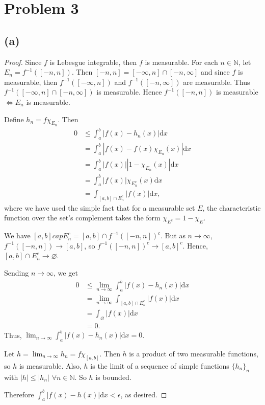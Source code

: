 \documentclass{article}
\newcommand{\N}{\mathbb{N}} %
\begin{document}
\section*{Problem 3}
\subsection*{(a)}
\begin{proof}
	Since $f$ is Lebesgue integrable, then $f$ is measurable. For each $n \in \N$, let $E_n = f^{-1}([-n, n])$. Then $[-n, n] = [-\infty, n] \cap [-n, \infty]$ and since $f$ is measurable, then $f^{-1}([-\infty, n])$ and $f^{-1}([-n, \infty])$ are measurable. Thus $f^{-1}([-\infty, n] \cap [-n, \infty])$ is measurable. Hence $f^{-1}([-n, n])$ is measurable $\iff E_n$ is measurable.
	
	Define $h_n = f\chi_{E_n}$. Then
	\begin{align}
		0 &\leq \int_a^b |f(x) - h_n(x)| \mathrm{d}x\\
		&= \int_a^b |f(x) - f(x)\chi_{E_n}(x)| \mathrm{d}x \\
		&= \int_a^b |f(x)||1 - \chi_{E_n}(x)| \mathrm{d}x \\
		&= \int_a^b |f(x)|\chi_{E_n^c}(x) \mathrm{d}x \\
		&= \int_{[a, b]\cap E_n^c}|f(x)| \mathrm{d}x,
	\end{align}
	where we have used the simple fact that for a measurable set $E$, the characteristic function over the set's complement takes the form $\chi_{E^c} = 1 - \chi_{E}$.
	
	We have $[a, b] cap E_n^c = [a, b] \cap f^{-1}([-n, n])^c$. But as $n \to \infty$, $f^{-1}([-n, n]) \to [a, b]$, so $f^{-1}([-n, n])^c \to [a, b]^c$. Hence, $[a, b] \cap E_n^c \to \varnothing$.
	
	Sending $n \to \infty$, we get
	\begin{align}
		0 &\leq \lim_{n \to \infty}\int_a^b |f(x) - h_n(x)| \mathrm{d}x \\
		&= \lim_{n \to \infty} \int_{[a, b]\cap E_n^c} |f(x)| \mathrm{d}x \\
		&= \int_{\varnothing}|f(x)| \mathrm{d}x \\
		&= 0.
	\end{align}
	Thus, $\lim_{n \to \infty}\int_a^b |f(x) - h_n(x)| \mathrm{d}x = 0$.
	
	Let $h = \lim_{n \to \infty}h_n = f \chi_{[a, b]}$. Then $h$ is a product of two measurable functions, so $h$ is measurable. Also, $h$ is the limit of a sequence of simple functions $\{h_n\}_n$ with $|h| \leq |h_n|$ $\forall n \in \N$. So $h$ is bounded.
	
	Therefore $\int_{a}^b |f(x) - h(x)|\mathrm{d}x < \epsilon$, as desired.
	

\end{proof}
\end{document}
